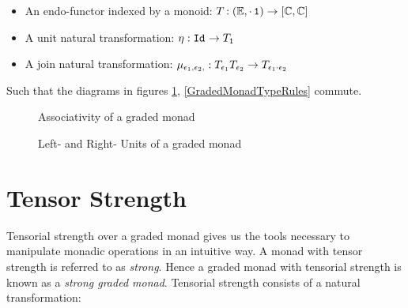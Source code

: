 \documentclass{Report}
\begin{document}
\begin{itemize}
    \item An endo-functor indexed by a monoid: $T_{}{}: (\mathbb{E}, \cdot\, \texttt{1})  \rightarrow [\mathbb{C}, \mathbb{C}]$
    \item A unit natural transformation: $\eta_{}: \texttt{Id}_{} \rightarrow T_{\texttt{1}}{}$
    \item A join natural transformation: $\mu_{\epsilon_1, \epsilon_2, }: T_{\epsilon_1}{T_{\epsilon_2}{}} \rightarrow T_{\epsilon_1 \cdot \epsilon_2}{}$
\end{itemize}

Such that the diagrams in figures \ref{GradedMonadAssociativity}, \ref{GradedMonadTypeRules} commute.


\begin{figure}
    \centering
    \begin{minipage}{0.45\textwidth}
        \centering
        \caption{Associativity of a graded monad}
        \label{GradedMonadAssociativity}
    \end{minipage}\hfill
    \begin{minipage}{0.45\textwidth}
        \centering
        \caption{Left- and Right- Units of a graded monad}
    \end{minipage}
\end{figure}


\section{Tensor Strength}
Tensorial strength over a graded monad gives us the tools necessary to manipulate monadic operations in an intuitive way. A monad with tensor strength is referred to as \textit{strong}. Hence a graded monad with tensorial strength is known as a \textit{strong graded monad}. Tensorial strength consists of a natural transformation:
\end{document}
